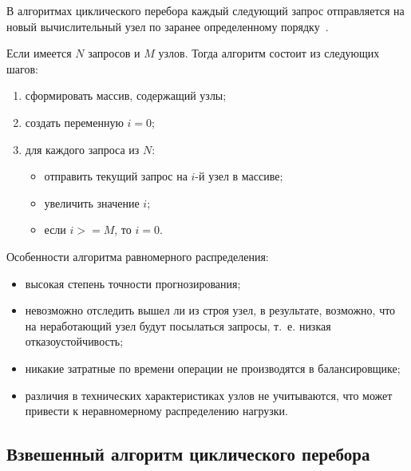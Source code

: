 В алгоритмах циклического перебора каждый следующий запрос отправляется на новый вычислительный узел по заранее определенному порядку~\cite{comp}.

Если имеется $N$ запросов и $M$ узлов. Тогда алгоритм состоит из следующих шагов:

\begin{enumerate}
	\item сформировать массив, содержащий узлы;
	\item создать переменную $i = 0$;
	\item для каждого запроса из $N$:
	\begin{itemize}
		\item отправить текущий запрос на $i$-й узел в массиве;
		\item увеличить значение $i$;
		\item если $i >= M$, то $i = 0$.
	\end{itemize}	
\end{enumerate}

Особенности алгоритма равномерного распределения:
\begin{itemize}
	\item высокая степень точности прогнозирования;
	\item невозможно отследить вышел ли из строя узел, в результате, возможно, что на неработающий узел будут посылаться запросы, т.~е. низкая отказоустойчивость;
	\item никакие затратные по времени операции не производятся в балансировщике;
	\item различия в технических характеристиках узлов не учитываются, что может привести к неравномерному распределению нагрузки.
\end{itemize}


\subsection*{Взвешенный алгоритм циклического перебора}

